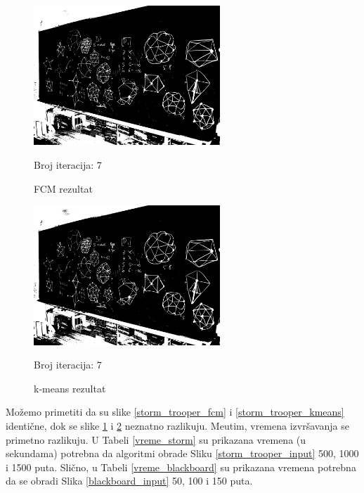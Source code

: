 \documentclass[12pt,a4paper]{article}
\theoremstyle{definition}
\theoremstyle{remark}
\theoremstyle{plain}
\begin{document}
\begin{multicols}{2}
\begin{figure}[H]
\centering
\includegraphics[width=7cm]{images/blackboard_binarized_fcm.png}
  \caption{FCM rezultat}\label{blackboard_fcm}
 Broj iteracija: 7
\end{figure}
\columnbreak
\begin{figure}[H]
\centering
\includegraphics[width=7cm]{images/blackboard_binarized_kmeans.png}
  \caption{k-means rezultat}\label{blackboard_kmeans}
  Broj iteracija: 7
\end{figure}
\end{multicols}

Mo\v zemo primetiti da su slike \ref{storm_trooper_fcm} i \ref{storm_trooper_kmeans} identi\v cne, dok se slike \ref{blackboard_fcm} i \ref{blackboard_kmeans} neznatno razlikuju. Me\dj utim, vremena izvr\v savanja se primetno razlikuju. U Tabeli \ref{vreme_storm} su prikazana vremena (u sekundama) potrebna da algoritmi obrade Sliku \ref{storm_trooper_input} 500, 1000 i 1500 puta. Sli\v cno, u Tabeli \ref{vreme_blackboard} su prikazana vremena potrebna da se obradi Slika \ref{blackboard_input} 50, 100 i 150 puta.
\end{document}
